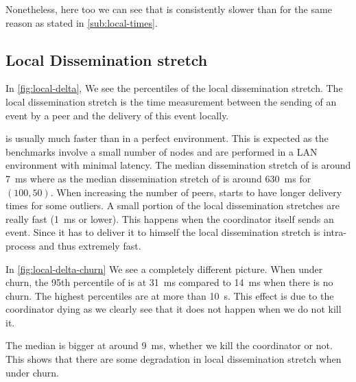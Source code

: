 Nonetheless, here too we can see that \epto is consistently slower than \jgroups for the same reason as stated in \autoref{sub:local-times}.
\subsection{Local Dissemination stretch}
% 	
In \autoref{fig:local-delta}, We see the percentiles of the local dissemination stretch. The local dissemination stretch is the time measurement between the sending of an event by a peer and the delivery of this event locally.
\par
\jgroups is usually much faster than \epto in a perfect environment. This is expected as the benchmarks involve a small number of nodes and are performed in a LAN environment with minimal latency. The median dissemination stretch of \jgroups is around \SI{7}{\milli\second} where as the median dissemination stretch of \epto is around \SI{630}{\milli\second} for $(100,50)$. When increasing the number of peers, \jgroups starts to have longer delivery times for some outliers. A small portion of the local dissemination stretches are really fast (\SI{1}{\milli\second} or lower). This happens when the coordinator itself sends an event. Since it has to deliver it to himself the local dissemination stretch is intra-process and thus extremely fast.

% 	
In \autoref{fig:local-delta-churn} We see a completely different picture. When under churn, the 95th percentile of \jgroups is at \SI{31}{\milli\second} compared to \SI{14}{\milli\second} when there is no churn. The highest percentiles are at more than \SI{10}{\second}. This effect is due to the coordinator dying as we clearly see that it does not happen when we do not kill it.

The median is bigger at around \SI{9}{\milli\second}, whether we kill the coordinator or not. This shows that there are some degradation in \jgroups local dissemination stretch when under churn.


